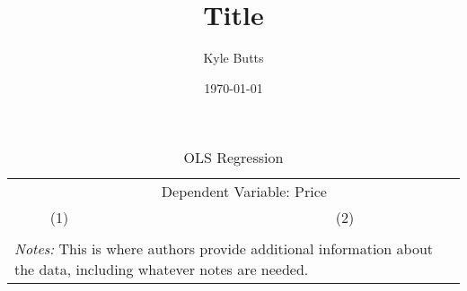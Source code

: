 \documentclass[11pt]{article}
\title{Title}
\date{\today}
\author{Kyle Butts}
\begin{document}
\begin{table}[tp] \centering 
    \caption{OLS Regression}
    \label{summ_stat}
        
        \begin{tabular}{llcc} 
        \hline \hline
        
        & \multicolumn{2}{c}{Dependent Variable: Price} \\
        & (1) & (2) \\
        \hline 

         \\
        \hline 
        
        
        \hline \hline
        
        \multicolumn{3}{p{100mm}}{\textit{Notes:} This is where authors provide additional information about the data, including whatever notes are needed.}
    \end{tabular}  

\end{table} 
\end{document}
